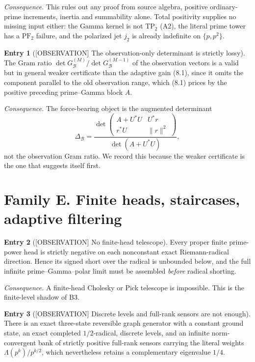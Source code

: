 \documentclass[11pt]{amsart}
\theoremstyle{definition}
\newcounter{family}
\newtheorem{entry}{Entry}[family]
\theoremstyle{remark}
\newcommand{\OBS}{\textup{[OBSERVATION]}}
\begin{document}
\emph{Consequence.} This rules out any proof from source algebra, positive
ordinary-prime increments, inertia and summability alone.  Total
positivity supplies no missing input either: the Gamma kernel is not
\(\mathrm{TP}_2\) (A2), the literal prime tower has a \(\mathrm{PF}_2\)
failure, and the polarized jet \(j_2\) is already indefinite on
\(\{p,p^2\}\).

\begin{entry}[\OBS{} The observation-only determinant is strictly lossy]
\label{ent:D4}
The Gram ratio
\(\det G_{\mathcal B}^{(M)}/\det G_{\mathcal B}^{(M-1)}\) of the
observation vectors is a valid but in general weaker certificate than the
adaptive gain (8.1), since it omits the component parallel to the old
observation range, which (8.1) prices by the positive preceding
prime--Gamma block \(A\).
\end{entry}

\emph{Consequence.} The force-bearing object is the augmented determinant
\[
 \Delta_{\mathcal B}
 =\frac{\det\begin{pmatrix}A+U^*U&U^*r\\ r^*U&\|r\|^2\end{pmatrix}}
        {\det(A+U^*U)},
\tag{8.1}
\]
not the observation Gram ratio.  We record this because the weaker
certificate is the one that suggests itself first.

\section{Family E. Finite heads, staircases, adaptive filtering}

\begin{entry}[\OBS{} No finite-head telescope]
\label{ent:E1}
Every proper finite prime-power head is strictly negative on each
nonconstant exact Riemann-radical direction.  Hence its signed short over
the radical is unbounded below, and the full infinite prime--Gamma--polar
limit must be assembled \emph{before} radical shorting.
\end{entry}

\emph{Consequence.} A finite-head Cholesky or Pick telescope is
impossible.  This is the finite-level shadow of B3.

\begin{entry}[\OBS{} Discrete levels and full-rank sensors are not enough]
\label{ent:E2}
There is an exact three-state reversible graph generator with a constant
ground state, an exact completed \(1/2\)-radical, discrete levels, and an
infinite norm-convergent bank of strictly positive full-rank sensors
carrying the literal weights \(\Lambda(p^k)/p^{k/2}\), which nevertheless
retains a complementary eigenvalue \(1/4\).
\end{entry}
\end{document}
